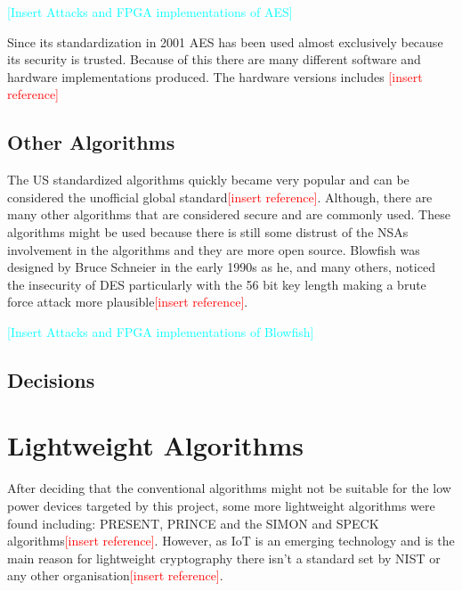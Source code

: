 \documentclass[12pt,twoside,a4paper]{report}
\begin{document}
    \textcolor{cyan}{[Insert Attacks and FPGA implementations of AES]}
    
    Since its standardization in 2001 AES has been used almost exclusively because its security is trusted. Because of this there are many different software and hardware implementations produced. The hardware versions includes \textcolor{red}{[insert reference]}   
    
    \subsection{Other Algorithms}
    The US standardized algorithms quickly became very popular and can be considered the unofficial global standard\textcolor{red}{[insert reference]}.
    Although, there are many other algorithms that are considered secure and are commonly used.
    These algorithms might be used because there is still some distrust of the NSAs involvement in the algorithms and they are more open source.
    Blowfish was designed by Bruce Schneier in the early 1990s as he, and many others, noticed the insecurity of DES particularly with the 56 bit key length making a brute force attack more plausible\textcolor{red}{[insert reference]}.
    
    \textcolor{cyan}{[Insert Attacks and FPGA implementations of Blowfish]}
    
    \subsection{Decisions}
    
    \section{Lightweight Algorithms}
    After deciding that the conventional algorithms might not be suitable for the low power devices targeted by this project, some more lightweight algorithms were found including: PRESENT, PRINCE and the SIMON and SPECK algorithms\textcolor{red}{[insert reference]}. However, as IoT is an emerging technology and is the main reason for lightweight cryptography there isn't a standard set by NIST or any other organisation\textcolor{red}{[insert reference]}.
    
\end{document}
